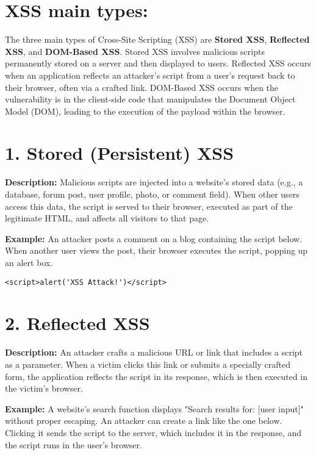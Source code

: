 \documentclass{article}
\begin{document}
\section*{XSS main types:}
The three main types of Cross-Site Scripting (XSS) are \textbf{Stored XSS}, \textbf{Reflected XSS}, and \textbf{DOM-Based XSS}. Stored XSS involves malicious scripts permanently stored on a server and then displayed to users. Reflected XSS occurs when an application reflects an attacker's script from a user's request back to their browser, often via a crafted link. DOM-Based XSS occurs when the vulnerability is in the client-side code that manipulates the Document Object Model (DOM), leading to the execution of the payload within the browser.

\section*{1. Stored (Persistent) XSS}
\textbf{Description:} Malicious scripts are injected into a website's stored data (e.g., a database, forum post, user profile, photo, or comment field). When other users access this data, the script is served to their browser, executed as part of the legitimate HTML, and affects all visitors to that page.

\textbf{Example:}
An attacker posts a comment on a blog containing the script below. When another user views the post, their browser executes the script, popping up an alert box.

\begin{lstlisting}[caption={Stored XSS example: malicious comment}, label={lst:stored}, firstnumber=1, frame=single]
                    <script>alert('XSS Attack!')</script>
\end{lstlisting}

\section*{2. Reflected XSS}
\textbf{Description:} An attacker crafts a malicious URL or link that includes a script as a parameter. When a victim clicks this link or submits a specially crafted form, the application reflects the script in its response, which is then executed in the victim's browser.

\textbf{Example:}
A website's search function displays "Search results for: [user input]" without proper escaping. An attacker can create a link like the one below. Clicking it sends the script to the server, which includes it in the response, and the script runs in the user's browser.
\end{document}
